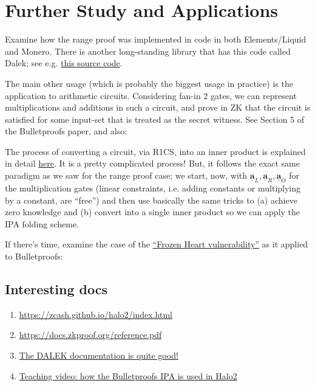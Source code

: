 \documentclass[10pt,a4paper]{article}
\begin{document}
\section{Further Study and Applications}

Examine how the range proof was implemented in code in both Elements/Liquid and Monero. There is another long-standing library that has this code called Dalek; see e.g. \href{https://docs.rs/crate/bulletproofs/3.0.0/source/src/range_proof/mod.rs}{this source code}.

\vspace{5 pt}

The main other usage (which is probably the biggest usage in practice) is the application to arithmetic circuits. Considering fan-in 2 gates, we can represent multiplications and additions in such a circuit, and prove in ZK that the circuit is satisfied for some input-set that is treated as the secret witness. See Section 5 of the Bulletproofs paper, and also:

\vspace{5 pt}

The process of converting a circuit, via R1CS, into an inner product is explained in detail \href{https://doc-internal.dalek.rs/develop/bulletproofs/notes/r1cs_proof/index.html}{here}. It is a pretty complicated process! But, it follows the exact same paradigm as we saw for the range proof case; we start, now, with $\underline{\textbf{a}}_L, \underline{\textbf{a}}_R, \underline{\textbf{a}}_O$ for the multiplication gates (linear constraints, i.e. adding constants or multiplying by a constant, are ``free'') and then use basically the same tricks to (a) achieve zero knowledge and (b) convert into a single inner product so we can apply the IPA folding scheme.

\vspace{5 pt}

If there's time, examine the case of the \href{https://blog.trailofbits.com/2022/04/15/the-frozen-heart-vulnerability-in-bulletproofs/}{``Frozen Heart vulnerability''} as it applied to Bulletproofs: 


\pagebreak

\subsection{Interesting docs}

\begin{enumerate}

\item \href{https://zcash.github.io/halo2/index.html}{https://zcash.github.io/halo2/index.html}

\item \href{https://docs.zkproof.org/reference.pdf}{https://docs.zkproof.org/reference.pdf}

\item \href{https://doc-internal.dalek.rs/bulletproofs/inner_product_proof/index.html}{The DALEK documentation is quite good!}

\item \href{https://www.youtube.com/watch?v=RaEs5mnXIhY}{Teaching video: how the Bulletproofs IPA is used in Halo2}

\end{enumerate}
\end{document}
